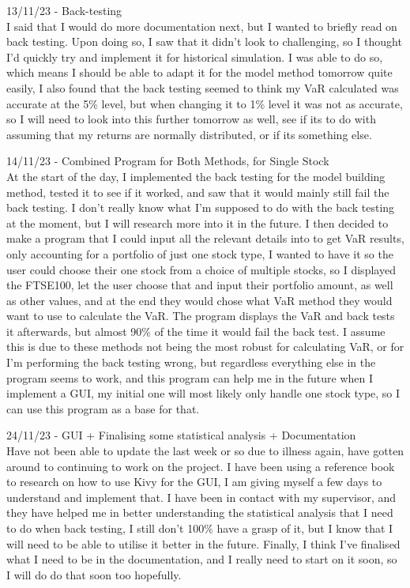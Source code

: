 \documentclass{article}
\begin{document}
13/11/23 - Back-testing\\
I said that I would do more documentation next, but I wanted to briefly read on back testing. Upon doing so, I saw that it didn't look to challenging, so I thought I'd quickly try and implement it for historical simulation. I was able to do so, which means I should be able to adapt it for the model method tomorrow quite easily, I also found that the back testing seemed to think my VaR calculated was accurate at the 5\% level, but when changing it to 1\% level it was not as accurate, so I will need to look into this further tomorrow as well, see if its to do with assuming that my returns are normally distributed, or if its something else.\\\vspace{0.3cm}

14/11/23 - Combined Program for Both Methods, for Single Stock\\
At the start of the day, I implemented the back testing for the model building method, tested it to see if it worked, and saw that it would mainly still fail the back testing. I don't really know what I'm supposed to do with the back testing at the moment, but I will research more into it in the future. I then decided to make a program that I could input all the relevant details into to get VaR results, only accounting for a portfolio of just one stock type, I wanted to have it so the user could choose their one stock from a choice of multiple stocks, so I displayed the FTSE100, let the user choose that and input their portfolio amount, as well as other values, and at the end they would chose what VaR method they would want to use to calculate the VaR. The program displays the VaR and back tests it afterwards, but almost 90\% of the time it would fail the back test. I assume this is due to these methods not being the most robust for calculating VaR, or for I'm performing the back testing wrong, but regardless everything else in the program seems to work, and this program can help me in the future when I implement a GUI, my initial one will most likely only handle one stock type, so I can use this program as a base for that.\\\vspace{0.3cm}

24/11/23 - GUI + Finalising some statistical analysis + Documentation\\
Have not been able to update the last week or so due to illness again, have gotten around to continuing to work on the project. I have been using a reference book to research on how to use Kivy for the GUI, I am giving myself a few days to understand and implement that. I have been in contact with my supervisor, and they have helped me in better understanding the statistical analysis that I need to do when back testing, I still don't 100\% have a grasp of it, but I know that I will need to be able to utilise it better in the future. Finally, I think I've finalised what I need to be in the documentation, and I really need to start on it soon, so I will do do that soon too hopefully.\\\vspace{0.3cm}
\end{document}
